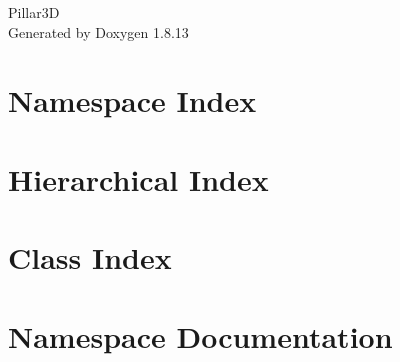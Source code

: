 \documentclass[twoside]{book}
\newcommand{\+}{\discretionary{\mbox{\scriptsize$\hookleftarrow$}}{}{}}
\newcommand{\clearemptydoublepage}{%
  \newpage{\pagestyle{empty}\cleardoublepage}%
}
\begin{document}
\hypersetup{pageanchor=false,
             bookmarksnumbered=true,
             pdfencoding=unicode
            }
\begin{titlepage}
\vspace*{7cm}
\begin{center}%
{\Large Pillar3D }\\
\vspace*{1cm}
{\large Generated by Doxygen 1.8.13}\\
\end{center}
\end{titlepage}
\clearemptydoublepage
{}
\tableofcontents
\clearemptydoublepage
{}
\hypersetup{pageanchor=true}

\chapter{Namespace Index}

\chapter{Hierarchical Index}

\chapter{Class Index}

\chapter{Namespace Documentation}




\end{document}
